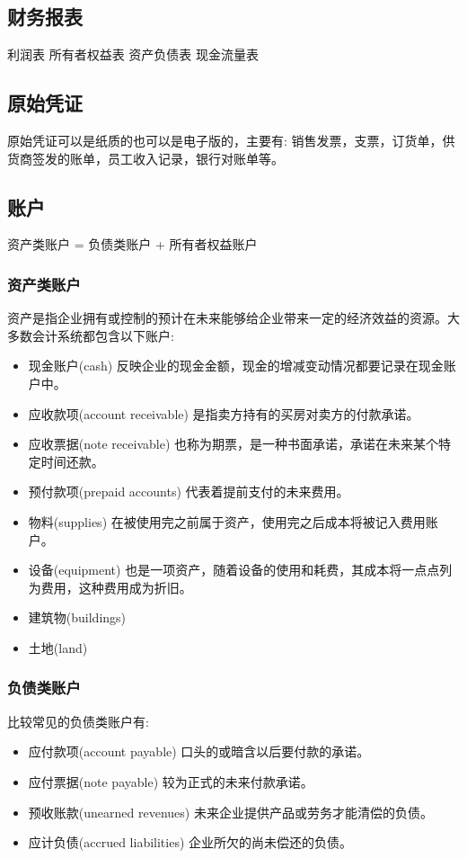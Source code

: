 \documentclass[11pt,a4paper]{sphinxmanual}
\begin{document}
\subsection{财务报表}
\label{sec-13-11-1}
利润表
所有者权益表
资产负债表
现金流量表

\subsection{原始凭证}
\label{sec-13-11-2}
原始凭证可以是纸质的也可以是电子版的，主要有: 销售发票，支票，订货单，供货商签发的账单，员工收入记录，银行对账单等。


\subsection{账户}
\label{sec-13-11-3}
资产类账户 = 负债类账户 + 所有者权益账户

\subsubsection{资产类账户}
\label{sec-13-11-3-1}
资产是指企业拥有或控制的预计在未来能够给企业带来一定的经济效益的资源。大多数会计系统都包含以下账户:
\begin{itemize}
\item 现金账户(cash) 反映企业的现金金额，现金的增减变动情况都要记录在现金账户中。
\item 应收款项(account receivable) 是指卖方持有的买房对卖方的付款承诺。
\item 应收票据(note receivable) 也称为期票，是一种书面承诺，承诺在未来某个特定时间还款。
\item 预付款项(prepaid accounts) 代表着提前支付的未来费用。
\item 物料(supplies) 在被使用完之前属于资产，使用完之后成本将被记入费用账户。
\item 设备(equipment) 也是一项资产，随着设备的使用和耗费，其成本将一点点列为费用，这种费用成为折旧。
\item 建筑物(buildings)
\item 土地(land)
\end{itemize}

\subsubsection{负债类账户}
\label{sec-13-11-3-2}
比较常见的负债类账户有:
\begin{itemize}
\item 应付款项(account payable) 口头的或暗含以后要付款的承诺。
\item 应付票据(note payable) 较为正式的未来付款承诺。
\item 预收账款(unearned revenues) 未来企业提供产品或劳务才能清偿的负债。
\item 应计负债(accrued liabilities) 企业所欠的尚未偿还的负债。
\end{itemize}
\end{document}
